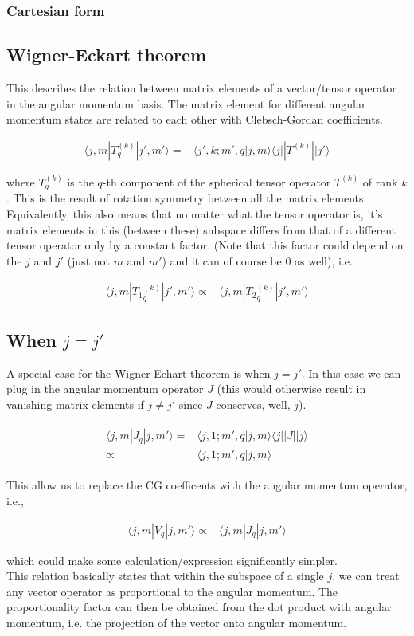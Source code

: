 \documentclass[10pt,fleqn]{article}
\newcommand{\eqar}[1]
{
  \begin{align}
    #1
  \end{align}
}
\begin{document}
\subsubsection{Cartesian form}

\subsection{Wigner-Eckart theorem}
This describes the relation between matrix elements of a vector/tensor operator
in the angular momentum basis.
The matrix element for different angular momentum states are related to each other
with Clebsch-Gordan coefficients.
\eqar{
  \langle j,m|T_q^{(k)}|j',m' \rangle=&\langle j',k;m',q|j,m\rangle\langle j||T^{(k)}||j'\rangle
}
where $T_q^{(k)}$ is the $q$-th component of
the spherical tensor operator $T^{(k)}$ of rank $k$.
This is the result of rotation symmetry between all the matrix elements.\\

Equivalently, this also means that no matter what the tensor operator is,
it's matrix elements in this (between these) subspace
differs from that of a different tensor operator only by a constant factor.
(Note that this factor could depend on the $j$ and $j'$ (just not $m$ and $m'$)
and it can of course be $0$ as well), i.e.
\eqar{
  \langle j,m|{T_1}_q^{(k)}|j',m'\rangle\propto&\langle j,m|{T_2}_q^{(k)}|j',m'\rangle
}

\subsection{When $j=j'$}
A special case for the Wigner-Echart theorem is when $j=j'$.
In this case we can plug in the angular momentum operator $J$
(this would otherwise result in vanishing matrix elements if $j\neq j'$
since $J$ conserves, well, $j$).
\eqar{
  \begin{split}
    \langle j,m|J_q|j,m' \rangle=&\langle j,1;m',q|j,m\rangle\langle j||J||j\rangle\\
    \propto&\langle j,1;m',q|j,m\rangle
  \end{split}
}
This allow us to replace the CG coefficents with the angular momentum operator, i.e.,
\eqar{
  \label{eq:jj:prop1}
  \langle j,m|V_q|j,m'\rangle\propto&\langle j,m|J_q|j,m'\rangle
}
which could make some calculation/expression significantly simpler.\\

This relation basically states that within the subspace of a single $j$,
we can treat any vector operator as proportional to the angular momentum.
The proportionality factor can then be obtained from the dot product
with angular momentum, i.e. the projection of the vector onto angular momentum.
\end{document}
